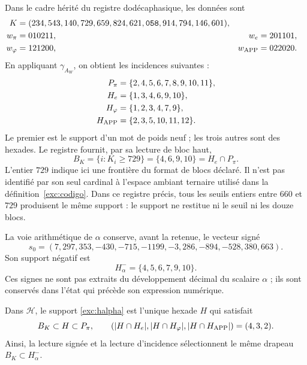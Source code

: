 Dans le cadre hérité du registre dodécaphasique, les données sont
\begin{align}
 K={}&(234,543,140,729,659,824,621,\mathtt{058},914,794,146,601),
 \label{exc:k}\\
 w_\pi={}&010211, &w_e={}&201101,\nonumber\\
 w_\varphi={}&121200, &w_{\rm APP}={}&022020.\nonumber
\end{align}
En appliquant $\gamma_{A_W}$, on obtient les incidences suivantes :
\begin{align*}
 P_\pi&=\{2,4,5,6,7,8,9,10,11\},\\
 H_e&=\{1,3,4,6,9,10\},\\
 H_\varphi&=\{1,2,3,4,7,9\},\\
 H_{\rm APP}&=\{2,3,5,10,11,12\}.
\end{align*}
Le premier est le support d'un mot de poids neuf ; les trois autres
sont des hexades. Le registre fournit, par sa lecture de bloc haut,
\begin{equation}
 B_K=\{i:K_i\geq729\}=\{4,6,9,10\}=H_e\cap P_\pi.
 \label{exc:bk}
\end{equation}
L'entier $729$ indique ici une frontière du format de blocs
déclaré. Il n'est pas identifié par son seul cardinal à l'espace ambiant
ternaire utilisé dans la définition~\ref{exc:codigo}. Dans ce registre précis, tous
les seuils entiers entre $660$ et $729$ produisent le même support :
le support ne restitue ni le seuil ni les douze blocs.

La voie arithmétique de $\alpha$ conserve, avant la retenue, le vecteur
signé
\begin{equation}
 s_0=(7,297,353,-430,-715,-1199,-3,286,-894,-528,380,663).
 \label{exc:precarry}
\end{equation}
Son support négatif est
\begin{equation}
 H^-_\alpha=\{4,5,6,7,9,10\}.
 \label{exc:halpha}
\end{equation}
Ces signes ne sont pas extraits du développement décimal du scalaire
$\alpha$ ; ils sont conservés dans l'état qui précède son expression numérique.

\begin{proposition}
\label{exc:selector-bandera}
Dans $\mathcal H$, le support \eqref{exc:halpha} est l'unique hexade $H$ qui satisfait
\[
 B_K\subset H\subset P_\pi,
 \qquad
 (|H\cap H_e|,|H\cap H_\varphi|,|H\cap H_{\rm APP}|)=(4,3,2).
\]
Ainsi, la lecture signée et la lecture d'incidence sélectionnent le même
drapeau $B_K\subset H^-_\alpha$.
\end{proposition}

